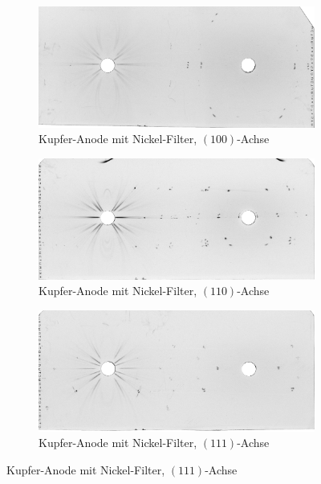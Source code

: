 	\begin{figure}[H]
		\begin{subfigure}[b]{\textwidth}
			\centering
			\includegraphics[scale=0.53]{images/cu-100.png}
			\caption{Kupfer-Anode mit Nickel-Filter, $(100)$-Achse}
			\label{fig:cu-100}
		\end{subfigure}

		\begin{subfigure}[b]{\textwidth}
			\centering
			\includegraphics[scale=0.53]{images/cu-110.png}
			\caption{Kupfer-Anode mit Nickel-Filter, $(110)$-Achse}
			\label{fig:cu-110}
		\end{subfigure}

		\begin{subfigure}[b]{\textwidth}
			\centering
			\includegraphics[scale=0.53]{images/cu-111.png}
			\caption{Kupfer-Anode mit Nickel-Filter, $(111)$-Achse}
			\label{fig:cu-111}
		\end{subfigure}


\end{figure}
